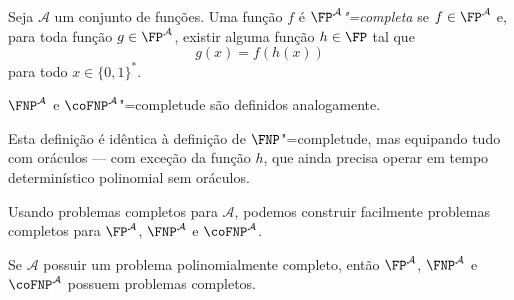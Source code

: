 \begin{definition}
    Seja $\mathcal A$ um conjunto de funções.
    Uma função $f$ é \emph{$\FP^\mathcal A$"=completa}
    se $f \in \FP^\mathcal A$ e,
    para toda função $g \in \FP^\mathcal A$,
    existir alguma função $h \in \FP$ tal que
    \begin{equation*}
        g(x) = f(h(x))
    \end{equation*}
    para todo $x \in \{0, 1\}^*$.

    $\FNP^\mathcal A$ e $\coFNP^\mathcal A$"=completude
    são definidos analogamente.
\end{definition}

Esta definição é idêntica à definição de $\FNP$"=completude,
mas equipando tudo com oráculos
--- com exceção da função $h$,
que ainda precisa operar em tempo determinístico polinomial sem oráculos.

Usando problemas completos para $\mathcal A$,
podemos construir facilmente problemas completos para $\FP^\mathcal A$,
$\FNP^\mathcal A$ e $\coFNP^\mathcal A$.

\begin{theorem}
    Se $\mathcal A$ possuir um problema polinomialmente completo,
    então $\FP^\mathcal A$, $\FNP^\mathcal A$ e $\coFNP^\mathcal A$
    possuem problemas completos.
\end{theorem}

